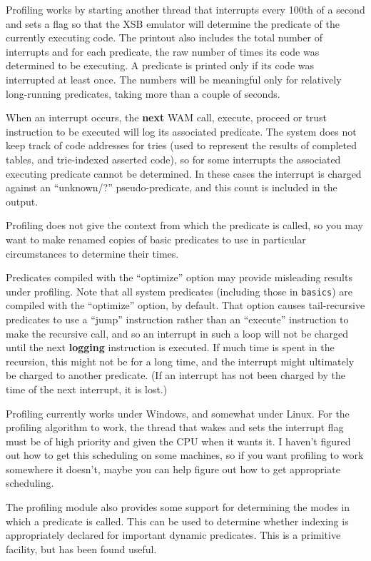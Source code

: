 Profiling works by starting another thread that interrupts every 100th
of a second and sets a flag so that the XSB emulator will determine
the predicate of the currently executing code.  The printout also
includes the total number of interrupts and for each predicate, the
raw number of times its code was determined to be executing.  A
predicate is printed only if its code was interrupted at least once.
The numbers will be meaningful only for relatively long-running
predicates, taking more than a couple of seconds.

When an interrupt occurs, the {\bf next} WAM call, execute, proceed or
trust instruction to be executed will log its associated predicate.
The system does not keep track of code addresses for tries (used to
represent the results of completed tables, and trie-indexed asserted
code), so for some interrupts the associated executing predicate
cannot be determined.  In these cases the interrupt is charged against
an ``unknown/?'' pseudo-predicate, and this count is included in the
output.

Profiling does not give the context from which the predicate is
called, so you may want to make renamed copies of basic predicates to
use in particular circumstances to determine their times.

Predicates compiled with the ``optimize'' option may provide
misleading results under profiling.  Note that all system predicates
(including those in {\tt basics}) are compiled with the ``optimize''
option, by default.  That option causes tail-recursive predicates to
use a ``jump'' instruction rather than an ``execute'' instruction to
make the recursive call, and so an interrupt in such a loop will not
be charged until the next {\bf logging} instruction is executed.  If
much time is spent in the recursion, this might not be for a long
time, and the interrupt might ultimately be charged to another
predicate.  (If an interrupt has not been charged by the time of the
next interrupt, it is lost.)

Profiling currently works under Windows, and somewhat under Linux.
For the profiling algorithm to work, the thread that wakes and sets
the interrupt flag must be of high priority and given the CPU when it
wants it.  I haven't figured out how to get this scheduling on some
machines, so if you want profiling to work somewhere it doesn't, maybe
you can help figure out how to get appropriate scheduling.

The profiling module also provides some support for determining the
modes in which a predicate is called.  This can be used to determine
whether indexing is appropriately declared for important dynamic
predicates.  This is a primitive facility, but has been found useful.

